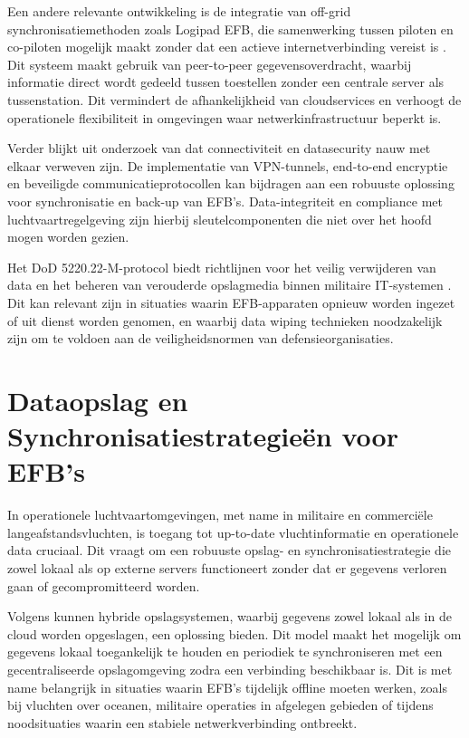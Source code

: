 Een andere relevante ontwikkeling is de integratie van off-grid synchronisatiemethoden zoals Logipad EFB, die samenwerking tussen piloten en co-piloten mogelijk maakt zonder dat een actieve internetverbinding vereist is \autocite{LogipadEFB}. Dit systeem maakt gebruik van peer-to-peer gegevensoverdracht, waarbij informatie direct wordt gedeeld tussen toestellen zonder een centrale server als tussenstation. Dit vermindert de afhankelijkheid van cloudservices en verhoogt de operationele flexibiliteit in omgevingen waar netwerkinfrastructuur beperkt is.

Verder blijkt uit onderzoek van \textcite{EFBDataSecurity} dat connectiviteit en datasecurity nauw met elkaar verweven zijn. De implementatie van VPN-tunnels, end-to-end encryptie en beveiligde communicatieprotocollen kan bijdragen aan een robuuste oplossing voor synchronisatie en back-up van EFB’s. Data-integriteit en compliance met luchtvaartregelgeving zijn hierbij sleutelcomponenten die niet over het hoofd mogen worden gezien.

Het DoD 5220.22-M-protocol biedt richtlijnen voor het veilig verwijderen van data en het beheren van verouderde opslagmedia binnen militaire IT-systemen \autocite{DoD5220}. Dit kan relevant zijn in situaties waarin EFB-apparaten opnieuw worden ingezet of uit dienst worden genomen, en waarbij data wiping technieken noodzakelijk zijn om te voldoen aan de veiligheidsnormen van defensieorganisaties.

        
\section{Dataopslag en Synchronisatiestrategieën voor EFB’s}

In operationele luchtvaartomgevingen, met name in militaire en commerciële langeafstandsvluchten, is toegang tot up-to-date vluchtinformatie en operationele data cruciaal. Dit vraagt om een robuuste opslag- en synchronisatiestrategie die zowel lokaal als op externe servers functioneert zonder dat er gegevens verloren gaan of gecompromitteerd worden.

Volgens \textcite{Yanamala2024} kunnen hybride opslagsystemen, waarbij gegevens zowel lokaal als in de cloud worden opgeslagen, een oplossing bieden. Dit model maakt het mogelijk om gegevens lokaal toegankelijk te houden en periodiek te synchroniseren met een gecentraliseerde opslagomgeving zodra een verbinding beschikbaar is. Dit is met name belangrijk in situaties waarin EFB’s tijdelijk offline moeten werken, zoals bij vluchten over oceanen, militaire operaties in afgelegen gebieden of tijdens noodsituaties waarin een stabiele netwerkverbinding ontbreekt. 

